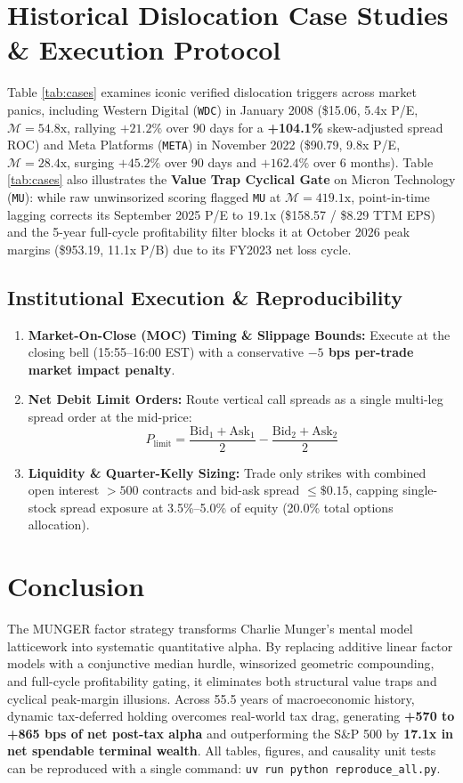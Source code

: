 \documentclass[10pt,twocolumn]{article}
\begin{document}
\section{Historical Dislocation Case Studies \& Execution Protocol}
Table \ref{tab:cases} examines iconic verified dislocation triggers across market panics, including Western Digital (\texttt{WDC}) in January 2008 (\$15.06, 5.4x P/E, $\mathcal{M}=54.8\text{x}$, rallying $+21.2\%$ over 90 days for a \textbf{+104.1\%} skew-adjusted spread ROC) and Meta Platforms (\texttt{META}) in November 2022 (\$90.79, 9.8x P/E, $\mathcal{M}=28.4\text{x}$, surging $+45.2\%$ over 90 days and $+162.4\%$ over 6 months). Table \ref{tab:cases} also illustrates the \textbf{Value Trap Cyclical Gate} on Micron Technology (\texttt{MU}): while raw unwinsorized scoring flagged \texttt{MU} at $\mathcal{M}=419.1\text{x}$, point-in-time lagging corrects its September 2025 P/E to $19.1\text{x}$ (\$158.57 / \$8.29 TTM EPS) and the 5-year full-cycle profitability filter blocks it at October 2026 peak margins (\$953.19, 11.1x P/B) due to its FY2023 net loss cycle.

\subsection{Institutional Execution \& Reproducibility}
\begin{enumerate}
    \item \textbf{Market-On-Close (MOC) Timing \& Slippage Bounds:} Execute at the closing bell (15:55--16:00 EST) with a conservative \textbf{$-5$ bps per-trade market impact penalty}.
    \item \textbf{Net Debit Limit Orders:} Route vertical call spreads as a single multi-leg spread order at the mid-price:
    \begin{equation}
        P_{\text{limit}} = \frac{\text{Bid}_1 + \text{Ask}_1}{2} - \frac{\text{Bid}_2 + \text{Ask}_2}{2}
    \end{equation}
    \item \textbf{Liquidity \& Quarter-Kelly Sizing:} Trade only strikes with combined open interest $> 500$ contracts and bid-ask spread $\le \$0.15$, capping single-stock spread exposure at 3.5\%--5.0\% of equity (20.0\% total options allocation).
\end{enumerate}

\section{Conclusion}
The MUNGER factor strategy transforms Charlie Munger's mental model latticework into systematic quantitative alpha. By replacing additive linear factor models with a conjunctive median hurdle, winsorized geometric compounding, and full-cycle profitability gating, it eliminates both structural value traps and cyclical peak-margin illusions. Across 55.5 years of macroeconomic history, dynamic tax-deferred holding overcomes real-world tax drag, generating \textbf{+570 to +865 bps of net post-tax alpha} and outperforming the S\&P 500 by \textbf{17.1x in net spendable terminal wealth}. All tables, figures, and causality unit tests can be reproduced with a single command: \texttt{uv run python reproduce\_all.py}.
\end{document}
